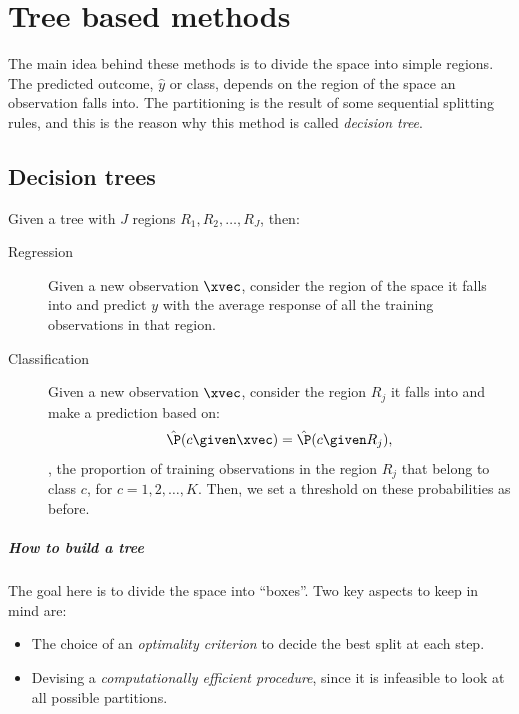 \chapter{Tree based methods}

The main idea behind these methods is to divide the space into simple regions. The predicted outcome, $\hat{y}$ or class, depends on the region of the space an observation falls into. The partitioning is the result of some sequential splitting rules, and this is the reason why this method is called \emph{decision tree}.

\section{Decision trees}

Given a tree with $J$ regions $R_1, R_2, \dots, R_J$, then:
\begin{description}
    \item[Regression] Given a new observation $\xvec$, consider the region of the space it falls into and predict $y$ with the average response of all the training observations in that region.
    \item[Classification] Given a new observation $\xvec$, consider the region $R_j$ it falls into and make a prediction based on:
          \begin{equation}
              \hat{\P}(c\given\xvec) = \hat{\P}(c\given R_j),
          \end{equation}
          \ie, the proportion of training observations in the region $R_j$ that belong to class $c$, for $c=1,2,\dots,K$. Then, we set a threshold on these probabilities as before.
\end{description}

\paragraph{How to build a tree}

The goal here is to divide the space into ``boxes''\negthinspace. Two key aspects to keep in mind are:
\begin{itemize}
    \item The choice of an \emph{optimality criterion} to decide the best split at each step.
    \item Devising a \emph{computationally efficient procedure}, since it is infeasible to look at all possible partitions.
\end{itemize}

